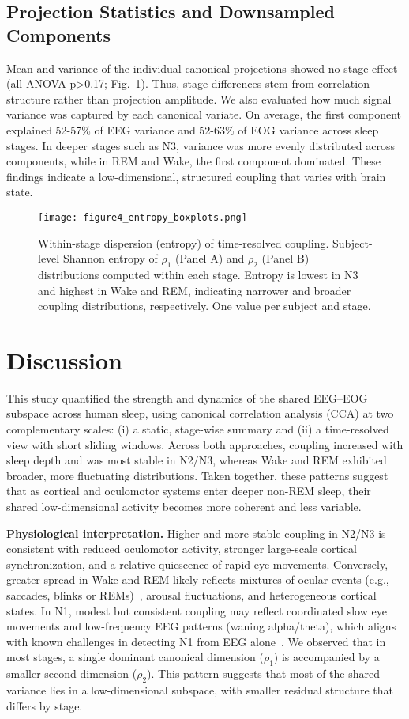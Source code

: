 \subsection{Projection Statistics and Downsampled Components}

Mean and variance of the individual canonical projections showed no stage effect (all ANOVA p>0.17; Fig.~\ref{fig:figure4}). Thus, stage differences stem from correlation structure rather than projection amplitude.
We also evaluated how much signal variance was captured by each canonical variate. On average, the first component explained 52-57\% of EEG variance and 52-63\% of EOG variance across sleep stages. In deeper stages such as N3, variance was more evenly distributed across components, while in REM and Wake, the first component dominated. These findings indicate a low-dimensional, structured coupling that varies with brain state.%
\begin{figure}[!t]
\centering
\texttt{[image: figure4\_entropy\_boxplots.png]}%
\caption{Within-stage dispersion (entropy) of time-resolved coupling. Subject-level Shannon entropy of $\rho_1$ (Panel A) and $\rho_2$ (Panel B) distributions computed within each stage. Entropy is lowest in N3 and highest in Wake and REM, indicating narrower and broader coupling distributions, respectively. One value per subject and stage.}\label{fig:figure4}
\end{figure}%

\section{Discussion}

This study quantified the strength and dynamics of the shared EEG--EOG subspace across human sleep, using canonical correlation analysis (CCA) at two complementary scales: (i) a static, stage-wise summary and (ii) a time-resolved view with short sliding windows. Across both approaches, coupling increased with sleep depth and was most stable in N2/N3, whereas Wake and REM exhibited broader, more fluctuating distributions. Taken together, these patterns suggest that as cortical and oculomotor systems enter deeper non-REM sleep, their shared low-dimensional activity becomes more coherent and less variable.

\textbf{Physiological interpretation.}
Higher and more stable coupling in N2/N3 is consistent with reduced oculomotor activity, stronger large-scale cortical synchronization, and a relative quiescence of rapid eye movements. Conversely, greater spread in Wake and REM likely reflects mixtures of ocular events (e.g., saccades, blinks or REMs)~\cite{hobson2010, mccarley1994}, arousal fluctuations, and heterogeneous cortical states. In N1, modest but consistent coupling may reflect coordinated slow eye movements and low-frequency EEG patterns (waning alpha/theta), which aligns with known challenges in detecting N1 from EEG alone~\cite{xu2025}. We observed that in most stages, a single dominant canonical dimension ($\rho_1$) is accompanied by a smaller second dimension ($\rho_2$). This pattern suggests that most of the shared variance lies in a low-dimensional subspace, with smaller residual structure that differs by stage.


